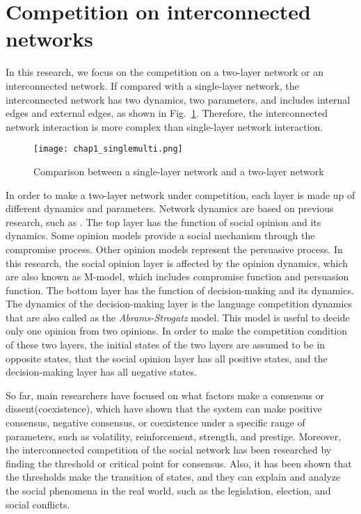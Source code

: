 \section{Competition on interconnected networks}
In this research, we focus on the competition on a two-layer network or an interconnected network. If compared with a single-layer network, the interconnected network has two dynamics, two parameters, and includes internal edges and external edges, as shown in Fig.~\ref{chap1_singlemulti}. Therefore, the interconnected network interaction is more complex than single-layer network interaction.

\begin{figure}[!htb]
	\centering
	\texttt{[image: chap1\_singlemulti.png]}
	\caption{Comparison between a single-layer network and a two-layer network}
	\label{chap1_singlemulti}
\end{figure}

In order to make a two-layer network under competition, each layer is made up of different dynamics and parameters. Network dynamics are based on previous research, such as \parencite{alvarez2016}. The top layer has the function of social opinion and its dynamics. Some opinion models provide a social mechanism through the compromise process\parencite{naim2003}. Other opinion models represent the persuasive process\parencite{chau2014}. In this research, the social opinion layer is affected by the opinion dynamics, which are also known as M-model\parencite{rocca2014}, which includes compromise function and persuasion function. The bottom layer has the function of decision-making and its dynamics. The dynamics of the decision-making layer is the language competition dynamics that are also called as the \textit{Abrams-Strogatz} model\parencite{abrams2003, vazquez2010, patriarca2012}. This model is useful to decide only one opinion from two opinions. In order to make the competition condition of these two layers, the initial states of the two layers are assumed to be in opposite states, that the social opinion layer has all positive states, and the decision-making layer has all negative states.

So far, main researchers have focused on what factors make a consensus or dissent(coexistence), which have shown that the system can make positive consensus, negative consensus, or coexistence under a specific range of parameters, such as volatility, reinforcement, strength, and prestige.\parencite{alvarez2016} Moreover, the interconnected competition of the social network has been researched by finding the threshold or critical point for consensus.\parencite{alvarez2016, gomez2015, diep2017} Also, it has been shown that the thresholds make the transition of states, and they can explain and analyze the social phenomena in the real world, such as the legislation, election, and social conflicts.\parencite{alvarez2016, gomez2015, amato2017, diep2017}


